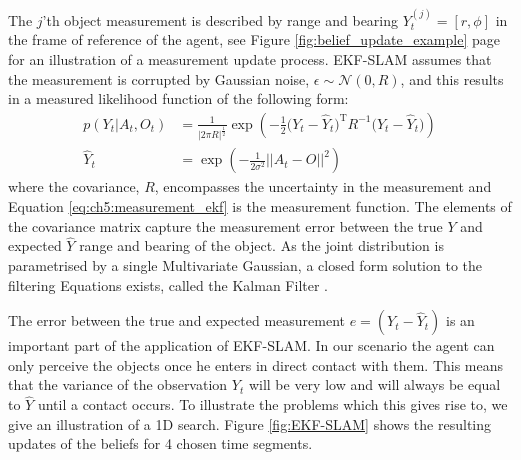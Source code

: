 The $j$'th object measurement is described by range and bearing  $Y^{(j)}_t = [r,\phi]$ in the frame of reference of the agent,
see Figure \ref{fig:belief_update_example} page \pageref{fig:belief_update_example} for an illustration of a measurement update process.
EKF-SLAM assumes that the measurement is corrupted by Gaussian noise, $\epsilon \sim \mathcal{N}(0,R)$,
and this results in a measured likelihood function of the following form:
\begin{align} 
   p(Y_t|A_t,O_t) &= \frac{1}{|2\pi R|^{\frac{1}{2}}} \exp \left( -\frac{1}{2} \big(Y_t - \hat{Y}_t\big)^{\mathrm{T}}R^{-1}\big(Y_t - \hat{Y}_t\big) \right)\label{eq:lik-measurement}\\
   \hat{Y}_t      &= \exp\left(-\frac{1}{2\sigma^2} ||A_t - O ||^2 \right)\label{eq:ch5:measurement_ekf}
\end{align}
where the covariance, $R$, encompasses the uncertainty in the measurement and Equation \ref{eq:ch5:measurement_ekf} is the measurement function. The elements of the covariance matrix capture 
the measurement error between the true $Y$ and expected $\hat{Y}$ range and bearing of the object. As the joint distribution 
is parametrised by a single Multivariate Gaussian, a closed form solution to the filtering Equations exists, called the Kalman 
Filter \cite{SLAM_part1}. 

The error between the true and expected measurement $e = (Y_t - \hat{Y}_t)$ is an important part of the application of EKF-SLAM.
In our scenario the agent can only perceive the objects once he enters in direct contact with them. 
This means that the variance of the observation $Y_t$ will be very low and will always be equal to $\hat{Y}$ until a contact occurs. 
To illustrate the problems which this gives rise to, we give an illustration of a 1D search. Figure \ref{fig:EKF-SLAM} shows the 
resulting updates of the beliefs for 4 chosen time segments.

